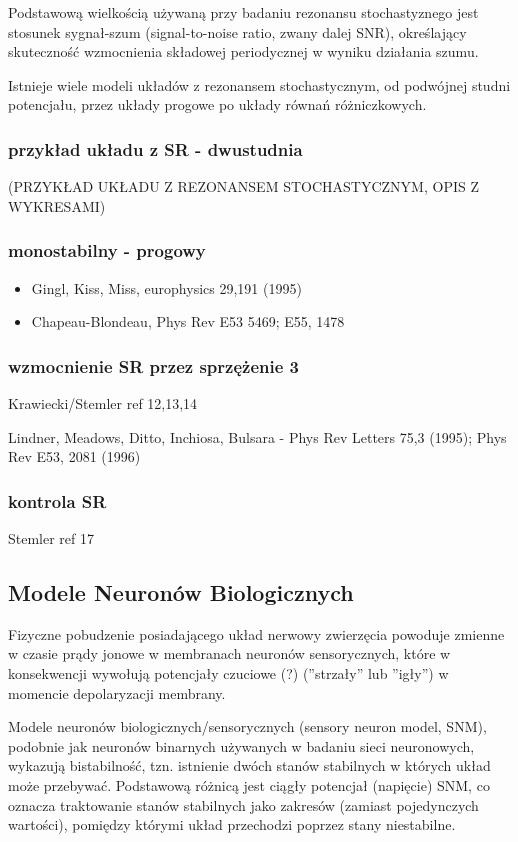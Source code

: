 \documentclass[12pt]{article}
\begin{document}
  Podstawową wielkością używaną przy badaniu rezonansu stochastyznego jest stosunek sygnał-szum (signal-to-noise ratio, zwany dalej SNR), określający skuteczność wzmocnienia składowej periodycznej w wyniku działania szumu.

  Istnieje wiele modeli układów z rezonansem stochastycznym, od podwójnej studni potencjału, przez układy progowe po układy równań różniczkowych.

  \subsubsection{przykład układu z SR - dwustudnia}

  (PRZYKŁAD UKŁADU Z REZONANSEM STOCHASTYCZNYM, OPIS Z WYKRESAMI)

  \subsubsection{monostabilny - progowy}
  \begin{itemize}
    \item Gingl, Kiss, Miss, europhysics 29,191 (1995)
    \item Chapeau-Blondeau, Phys Rev E53 5469; E55, 1478
  \end{itemize}

  \subsubsection{wzmocnienie SR przez sprzężenie 3}
  Krawiecki/Stemler ref 12,13,14

  Lindner, Meadows, Ditto, Inchiosa, Bulsara - Phys Rev Letters 75,3 (1995); Phys Rev E53, 2081 (1996)

  \subsubsection{kontrola SR}
  Stemler ref 17
  
  \subsection{Modele Neuronów Biologicznych}
  
  Fizyczne pobudzenie posiadającego układ nerwowy zwierzęcia powoduje zmienne w czasie prądy jonowe w membranach neuronów sensorycznych, które w konsekwencji wywołują potencjały czuciowe (?) (''strzały'' lub ''igły'') w momencie depolaryzacji membrany.
  
  Modele neuronów biologicznych/sensorycznych (sensory neuron model, SNM), podobnie jak neuronów binarnych używanych w badaniu sieci neuronowych, wykazują bistabilność, tzn. istnienie dwóch stanów stabilnych w których układ może przebywać. Podstawową różnicą jest ciągły potencjał (napięcie) SNM, co oznacza traktowanie stanów stabilnych jako zakresów (zamiast pojedynczych wartości), pomiędzy którymi układ przechodzi poprzez stany niestabilne. 
  
\end{document}
